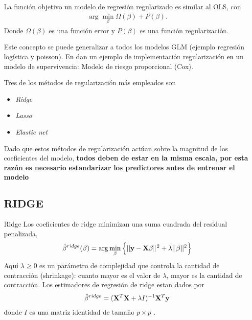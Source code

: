 \begin{frame}
    La función objetivo  un modelo de regresión regularizado es similar al OLS, con 
\begin{align}
    \arg \min_{\beta} \Omega(\beta)+P(\beta).
\end{align}
Donde $\Omega(\beta)$ es una función error y $P(\beta)$ es una función regularización. \citep{linear_regression_with_r}

Este concepto se puede generalizar a todos los modelos GLM (ejemplo regresión logística y poisson). En \cite{cox_lasso} dan un ejemplo de implementación regularización en un modelo de supervivencia: Modelo de riesgo proporcional (Cox).
\end{frame}
\begin{frame}
    Tres de los métodos de regularización más empleados son 
    \begin{itemize}
        \item \textit{Ridge}
        \item \textit{Lasso}
        \item \textit{Elastic net}
    \end{itemize}
Dado que estos métodos de regularización actúan sobre la magnitud de los coeficientes del modelo, \textbf{todos deben de estar en la misma escala, por esta razón es necesario estandarizar los predictores antes de entrenar el modelo} 
\end{frame}


\subsection{RIDGE}
\begin{frame}{Ridge}
 Los coeficientes de ridge minimizan una suma cuadrada del residual penalizada, 
\begin{align} \label{ridge}
\hat{\beta}^{ridge}(\beta) = \arg \min_{\beta} \left\{||\mathbf{y}- \mathbf{X} \beta||^2+\lambda||\beta||^2 \right\}
\end{align}
Aquí $\lambda\geq 0$ es un parámetro de complejidad que controla la cantidad de contracción (shrinkage): cuanto mayor es el valor de $\lambda$, mayor es la cantidad de contracción.  
Los estimadores de regresión de ridge estan dados por 
\begin{align}
    \hat{\beta}^{ridge} = (\mathbf{X}^T\mathbf{X}+\lambda I)^{-1}\mathbf{X}^T\mathbf{y}
\end{align}
donde $I$ es una matriz identidad de tamaño $p \times p$ \citep{ridge}.
  
\end{frame}

